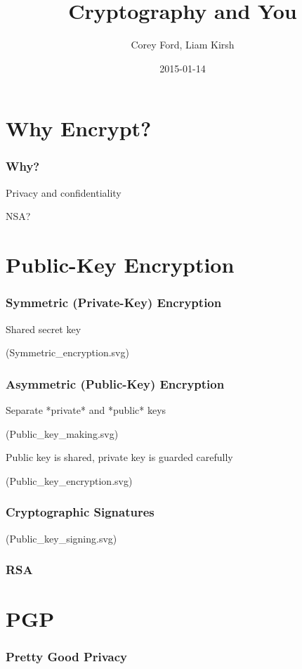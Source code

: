 \documentclass{beamer}
\title{Cryptography and You}
\author{Corey Ford, Liam Kirsh}
\institute{The White Hat}
\date{2015-01-14}
\begin{document}
\frame{\titlepage}

\section{Why Encrypt?}

\begin{frame}
  \frametitle{Why?}

Privacy and confidentiality

NSA?

\end{frame}

\section{Public-Key Encryption}

\begin{frame}
  \frametitle{Symmetric (Private-Key) Encryption}

Shared secret key

(Symmetric\_encryption.svg)

\end{frame}

\begin{frame}
  \frametitle{Asymmetric (Public-Key) Encryption}

Separate *private* and *public* keys

(Public\_key\_making.svg)

Public key is shared, private key is guarded carefully

(Public\_key\_encryption.svg)

\end{frame}

\begin{frame}
  \frametitle{Cryptographic Signatures}

(Public\_key\_signing.svg)

\end{frame}

\begin{frame}
  \frametitle{RSA}
\end{frame}

\section{PGP}

\begin{frame}
  \frametitle{Pretty Good Privacy}
\end{frame}
\end{document}
